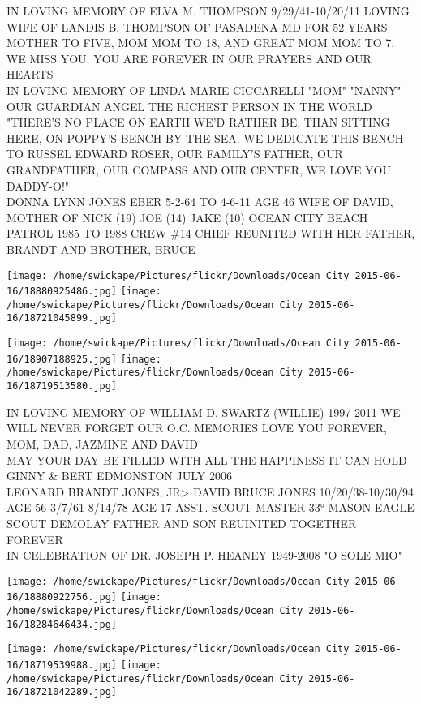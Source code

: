 \documentclass[10pt,letterpaper]{article}
\begin{document}
IN LOVING MEMORY OF ELVA M. THOMPSON 9/29/41{-}10/20/11 LOVING WIFE OF LANDIS B. THOMPSON OF PASADENA MD FOR 52 YEARS MOTHER TO FIVE, MOM MOM TO 18, AND GREAT MOM MOM TO 7.  WE MISS YOU.  YOU ARE FOREVER IN OUR PRAYERS AND OUR HEARTS\\
IN LOVING MEMORY OF LINDA MARIE CICCARELLI "MOM" "NANNY" OUR GUARDIAN ANGEL THE RICHEST PERSON IN THE WORLD\\
"THERE'S NO PLACE ON EARTH WE'D RATHER BE, THAN SITTING HERE, ON POPPY'S BENCH BY THE SEA. WE DEDICATE THIS BENCH TO RUSSEL EDWARD ROSER, OUR FAMILY'S FATHER, OUR GRANDFATHER, OUR COMPASS AND OUR CENTER, WE LOVE YOU DADDY{-}O!"\\
DONNA LYNN JONES EBER 5{-}2{-}64 TO 4{-}6{-}11 AGE 46 WIFE OF DAVID, MOTHER OF NICK (19) JOE (14) JAKE (10) OCEAN CITY BEACH PATROL 1985 TO 1988 CREW \#14 CHIEF REUNITED WITH HER FATHER, BRANDT AND BROTHER, BRUCE\\
\pagebreak

\texttt{[image: /home/swickape/Pictures/flickr/Downloads/Ocean City 2015-06-16/18880925486.jpg]}
\texttt{[image: /home/swickape/Pictures/flickr/Downloads/Ocean City 2015-06-16/18721045899.jpg]}

\texttt{[image: /home/swickape/Pictures/flickr/Downloads/Ocean City 2015-06-16/18907188925.jpg]}
\texttt{[image: /home/swickape/Pictures/flickr/Downloads/Ocean City 2015-06-16/18719513580.jpg]}

IN LOVING MEMORY OF WILLIAM D. SWARTZ (WILLIE) 1997{-}2011 WE WILL NEVER FORGET OUR O.C. MEMORIES LOVE YOU FOREVER, MOM, DAD, JAZMINE AND DAVID\\
MAY YOUR DAY BE FILLED WITH ALL THE HAPPINESS IT CAN HOLD GINNY \& BERT EDMONSTON JULY 2006\\
LEONARD BRANDT JONES, JR>  DAVID BRUCE JONES 10/20/38{-}10/30/94 AGE 56 3/7/61{-}8/14/78 AGE 17 ASST. SCOUT MASTER 33° MASON EAGLE SCOUT DEMOLAY FATHER AND SON REUINITED TOGETHER FOREVER\\
IN CELEBRATION OF DR. JOSEPH P. HEANEY 1949{-}2008 "O SOLE MIO"\\
\pagebreak

\texttt{[image: /home/swickape/Pictures/flickr/Downloads/Ocean City 2015-06-16/18880922756.jpg]}
\texttt{[image: /home/swickape/Pictures/flickr/Downloads/Ocean City 2015-06-16/18284646434.jpg]}

\texttt{[image: /home/swickape/Pictures/flickr/Downloads/Ocean City 2015-06-16/18719539988.jpg]}
\texttt{[image: /home/swickape/Pictures/flickr/Downloads/Ocean City 2015-06-16/18721042289.jpg]}
\end{document}
